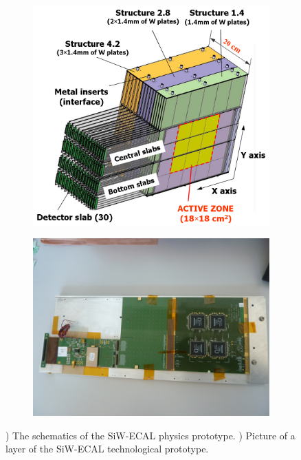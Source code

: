 \begin{figure}[htbp!]
  \centering
  \begin{subfigure}[t]{0.49\textwidth}
    \includegraphics[width=1.\linewidth]{chap3/fig/3DProtoH.png}
    \caption{} \label{fig:SiWECALPhysics}
  \end{subfigure}
  \hfill
  \begin{subfigure}[t]{0.49\textwidth}
    \includegraphics[width=1.\linewidth]{chap3/fig/SiW-ECAL_Techno.png}
    \caption{} \label{fig:SiWECALTechno}
  \end{subfigure}
  \caption{) The schematics of the SiW-ECAL physics prototype. ) Picture of a layer of the SiW-ECAL technological prototype.}
\end{figure}


